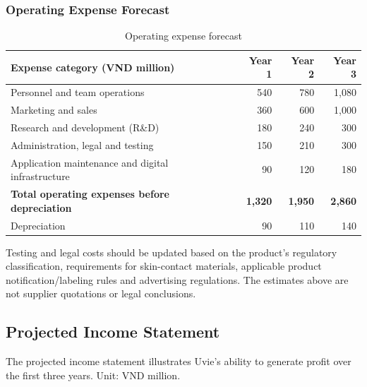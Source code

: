 \subsubsection{Operating Expense Forecast}
\begin{table}[ht]
\centering\small
\caption{Operating expense forecast}\label{tab:opex}
\begin{tabular}{@{}L{7.4cm}rrr@{}}
  \toprule
  \textbf{Expense category (VND million)} & \textbf{Year 1} & \textbf{Year 2} & \textbf{Year 3}\\
  \midrule
  Personnel and team operations & 540 & 780 & 1,080\\
  Marketing and sales & 360 & 600 & 1,000\\
  Research and development (R\&D) & 180 & 240 & 300\\
  Administration, legal and testing & 150 & 210 & 300\\
  Application maintenance and digital infrastructure & 90 & 120 & 180\\
  \midrule
  \textbf{Total operating expenses before depreciation} & \textbf{1,320} & \textbf{1,950} & \textbf{2,860}\\
  Depreciation & 90 & 110 & 140\\
  \bottomrule
\end{tabular}
\end{table}

Testing and legal costs should be updated based on the product's regulatory
classification, requirements for skin-contact materials, applicable product
notification/labeling rules and advertising regulations. The estimates above are
not supplier quotations or legal conclusions.

\subsection{Projected Income Statement}
The projected income statement illustrates Uvie's ability to generate profit over
the first three years. Unit: VND million.

